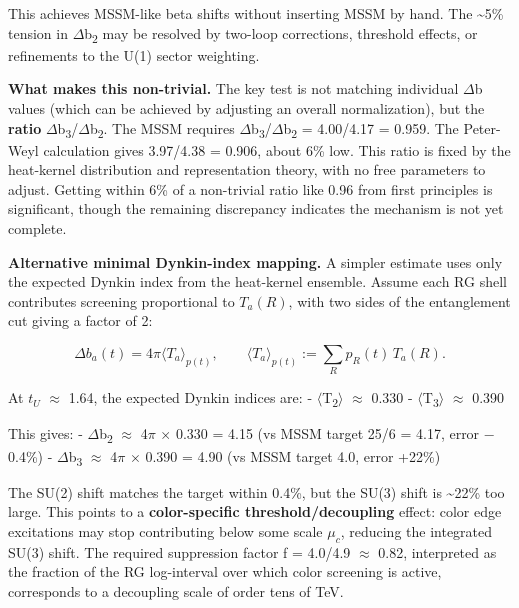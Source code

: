 \documentclass[11pt,a4paper]{article}
\theoremstyle{remark}
\begin{document}
This achieves MSSM-like beta shifts without inserting MSSM by hand. The \textasciitilde5\% tension in \ensuremath{\Delta}b\textsubscript{2} may be resolved by two-loop corrections, threshold effects, or refinements to the U(1) sector weighting.

\textbf{What makes this non-trivial.} The key test is not matching individual \ensuremath{\Delta}b values (which can be achieved by adjusting an overall normalization), but the \textbf{ratio} \ensuremath{\Delta}b\textsubscript{3}/\ensuremath{\Delta}b\textsubscript{2}. The MSSM requires \ensuremath{\Delta}b\textsubscript{3}/\ensuremath{\Delta}b\textsubscript{2} = 4.00/4.17 = 0.959. The Peter-Weyl calculation gives 3.97/4.38 = 0.906, about 6\% low. This ratio is fixed by the heat-kernel distribution and representation theory, with no free parameters to adjust. Getting within 6\% of a non-trivial ratio like 0.96 from first principles is significant, though the remaining discrepancy indicates the mechanism is not yet complete.

\textbf{Alternative minimal Dynkin-index mapping.} A simpler estimate uses only the expected Dynkin index from the heat-kernel ensemble. Assume each RG shell contributes screening proportional to \(T_a(R)\), with two sides of the entanglement cut giving a factor of 2:

\[
\Delta b_a(t) = 4\pi \langle T_a \rangle_{p(t)}, \qquad
\langle T_a \rangle_{p(t)} := \sum_R p_R(t) \, T_a(R).
\]

At \(t_U\) \ensuremath{\approx} 1.64, the expected Dynkin indices are:
- \ensuremath{\langle}T\textsubscript{2}\ensuremath{\rangle} \ensuremath{\approx} 0.330
- \ensuremath{\langle}T\textsubscript{3}\ensuremath{\rangle} \ensuremath{\approx} 0.390

This gives:
- \ensuremath{\Delta}b\textsubscript{2} \ensuremath{\approx} 4\ensuremath{\pi} \ensuremath{\times} 0.330 = 4.15 (vs MSSM target 25/6 = 4.17, error \ensuremath{-}0.4\%)
- \ensuremath{\Delta}b\textsubscript{3} \ensuremath{\approx} 4\ensuremath{\pi} \ensuremath{\times} 0.390 = 4.90 (vs MSSM target 4.0, error +22\%)

The SU(2) shift matches the target within 0.4\%, but the SU(3) shift is \textasciitilde22\% too large. This points to a \textbf{color-specific threshold/decoupling} effect: color edge excitations may stop contributing below some scale \(\ensuremath{\mu}_c\), reducing the integrated SU(3) shift. The required suppression factor f = 4.0/4.9 \ensuremath{\approx} 0.82, interpreted as the fraction of the RG log-interval over which color screening is active, corresponds to a decoupling scale of order tens of TeV.
\end{document}
